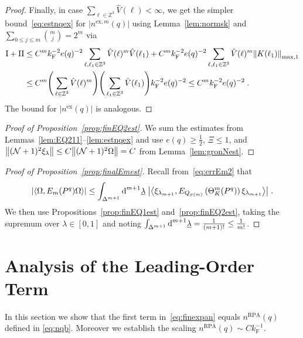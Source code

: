 \documentclass[12pt,a4paper]{article}
\numberwithin{equation}{section}
\newcommand{\1}{\mathbb{I}}
\newcommand{\di}{\textnormal{d}}
\newcommand{\ex}{\mathrm{ex}}
\newcommand{\F}{\mathrm{F}}
\newcommand{\I}{\mathrm{I}}
\newcommand{\II}{\mathrm{II}}
\newcommand{\RPA}{\mathrm{RPA}}
\newcommand{\Zstar}{\mathbb{Z}^3} %
\newcommand{\Z}{\mathbb{Z}}
\newcommand{\NN}{\mathcal{N}}
\newcommand{\half}{\frac{1}{2}}
\newcommand{\eva}[1]{\left\langle #1 \right\rangle}
\theoremstyle{plain}
\theoremstyle{definition}
\theoremstyle{remark}
\theoremstyle{plain}
\theoremstyle{definition}
\theoremstyle{remark}
\begin{document}
\begin{proof}
Finally, in case $ \sum_{\ell \in \Zstar} \hat{V}(\ell) < \infty $, we get the simpler bound~\eqref{eq:estnqex} for $ |n^{\ex,m}(q)| $ using Lemma~\ref{lem:normsk} and $ \sum_{0 \le j \le m} {{m}\choose j} = 2^m $ via
\begin{align}
	\I + \II
	&\leq C^m k_{\F}^{-2} e(q)^{-2} \sum_{\ell,\ell_1 \in \Zstar}
		\hat{V}(\ell)^m
		\hat{V}(\ell_1)
	+ C^m k_{\F}^{-2} e(q)^{-2} \sum_{\ell,\ell_1 \in \Zstar}
		\hat{V}(\ell)^m
		\norm{K(\ell_1)}_{\max,1} \nonumber\\
	&\leq C^m
		\Bigg( \sum\limits_{\ell \in \Zstar} \hat{V}(\ell)^m \Bigg)
		\Bigg( \sum\limits_{\ell_1 \in \Zstar} \hat{V}(\ell_1) \Bigg)
		k_{\F}^{-2} e(q)^{-2}
	\leq C^m k_{\F}^{-2} e(q)^{-2} \;.
\end{align}
The bound for $ |n^{\ex}(q)| $ is analogous.
\end{proof}



\begin{proof}[Proof of Proposition~\ref{prop:finEQ2est}]
We sum the estimates from Lemmas~\ref{lem:EQ211}--\ref{lem:estnqex} and use $ e(q) \ge \half $, $ \Xi \le 1 $, and $ \norm{(\NN+1)^2 \xi_\lambda} \le C \norm{(\NN+1)^2 \Omega} = C $ from Lemma~\ref{lem:gronNest}.
\end{proof}



\begin{proof}[Proof of Proposition~\ref{prop:finalEmest}]
Recall from~\eqref{eq:errEm2} that
\begin{equation}
	\abs{\eva{\Omega, E_m(P^q) \Omega }}
	\le \int_{\Delta^{m+1}} \di^{m+1}\underline{\lambda} \;
		\abs{\eva{\xi_{\lambda_{m+1}}, E_{Q_{\sigma(m)}}\left(\Theta^{m}_{K}(P^q)\right) \xi_{\lambda_{m+1}}}} \;.
\end{equation}		
We then use Propositions~\ref{prop:finEQ1est} and~\ref{prop:finEQ2est}, taking the supremum over $ \lambda \in [0,1] $ and noting $ \int_{\Delta^{m+1}} \di^{m+1} \underline{\lambda} = \frac{1}{(m+1)!} \le \frac{1}{m!} $.
\end{proof}



\section{Analysis of the Leading-Order Term}
\label{sec:leading_order_analysis}


In this section we show that the first term in~\eqref{eq:finexpan} equals $ n^{\RPA}(q) $ defined in \eqref{eq:nqb}. Moreover we establish the scaling $ n^{\RPA}(q) \sim C k_{\F}^{-1} $.
\end{document}
